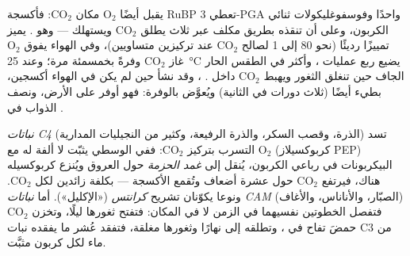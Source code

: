 \begin{proposition}\label{prop:b1:photosynthesis:photorespiration}
يقبل  أيضًا $\mathrm{O_2}$ مكان $\mathrm{CO_2}$: فأكسجة RuBP
تعطي 3-PGA واحدًا وفوسفوغليكولات ثنائي الكربون، وعلى  أن
تنقذه بطريق مكلف عبر ثلاث  يطلق $\mathrm{CO_2}$ ويستهلك  ---
وهو \emph{}.  يميز تمييزًا رديئًا (نحو
\qty{80}{} إلى 1 لصالح $\mathrm{CO_2}$ عند تركيزين متساويين)، وفي
الهواء يفوق $\mathrm{O_2}$ غاز $\mathrm{CO_2}$ وفرةً بخمسمئة مرة؛
وعند \qty{25}{\celsius} يضيع ربع عمليات ، وأكثر في الطقس الحار
الجاف حين تنغلق الثغور ويهبط $\mathrm{CO_2}$ داخل . ،
وقد نشأ حين لم يكن في الهواء أكسجين، بطيء أيضًا (ثلاث دورات في
الثانية) ويُعوَّض بالوفرة: فهو أوفر  على الأرض، ونصف 
الذواب في .
\end{proposition}

\begin{definition}\label{def:b1:photosynthesis:c4cam}
\emph{نباتات C4} (الذرة، وقصب السكر، والذرة الرفيعة، وكثير من
النجيليات المدارية) تسد التسرب بتركيز $\mathrm{CO_2}$: ففي 
 الوسطي يثبّت  لا ألفة له مع $\mathrm{O_2}$ (كربوكسيلاز
PEP) البيكربونات في  رباعي الكربون، يُنقل إلى  \emph{غمد
الحزمة} حول العروق ويُنزع كربوكسيله هناك، فيرتفع $\mathrm{CO_2}$
حول  عشرة أضعاف وتُقمع الأكسجة --- بكلفة  زائدين لكل
$\mathrm{CO_2}$. ونوعا  يكوّنان تشريح \emph{كرانتس}
(«الإكليل»). أما \emph{نباتات CAM} (الصبّار، والأناناس، والأغاف)
فتفصل الخطوتين نفسيهما في الزمن لا في المكان: فتفتح ثغورها ليلًا،
وتخزن $\mathrm{CO_2}$ حمضَ تفاح في ، وتطلقه إلى  نهارًا
وثغورها مغلقة، فتفقد عُشر ما يفقده نبات C3 من ماء لكل كربون مثبَّت.
\end{definition}


